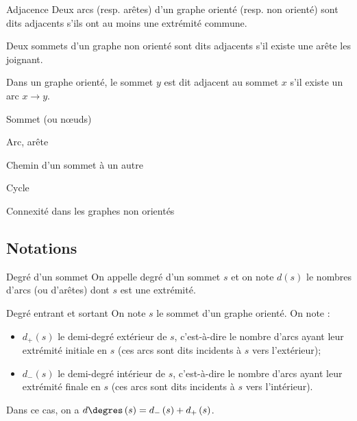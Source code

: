 \begin{defi}{Adjacence}
Deux arcs (resp. arêtes) d'un graphe orienté (resp. non orienté) sont dits adjacents s'ils ont au moins une extrémité commune. 

Deux sommets d'un graphe non orienté sont dits adjacents s'il existe une arête les joignant. 

Dans un graphe orienté, le sommet $y$ est dit adjacent au sommet $x$ s'il existe un arc $x\to y$.
\end{defi}


\begin{defi}{Sommet (ou n\oe{}uds)}
\end{defi}

\begin{defi}{Arc, arête}
\end{defi}

\begin{defi}{Chemin d'un sommet à un autre}
\end{defi}

\begin{defi}{Cycle}
\end{defi}

\begin{defi}{Connexité dans les graphes non orientés}
\end{defi}

\subsection{Notations}
\begin{defi}{Degré d'un sommet}
On appelle degré d'un sommet $s$ et on note $d\left(s\right)$ le nombres d'arcs (ou d'arêtes) dont $s$ est une extrémité.
\end{defi}

\begin{defi}{Degré entrant et sortant}
On note $s$ le sommet d'un graphe orienté. On note : 
\begin{itemize}
\item $d_{+}\left(s\right)$ le demi-degré extérieur de $s$, c'est-à-dire le nombre d'arcs ayant leur extrémité initiale en $s$ (ces arcs sont dits incidents à $s$ vers l'extérieur);
\item $d_{-}\left(s\right)$ le demi-degré intérieur de $s$, c'est-à-dire le nombre d'arcs ayant leur extrémité finale en $s$ (ces arcs sont dits incidents à $s$ vers l'intérieur).
\end{itemize}

Dans ce cas, on a  $d\degres\left(s\right)=d_{-}\left(s\right)+d_{+}\left(s\right)$.
\end{defi}


